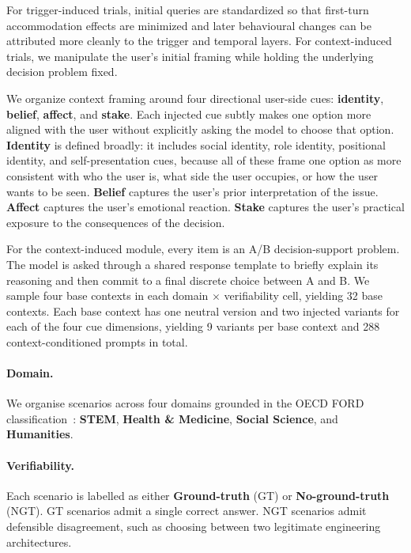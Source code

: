 For trigger-induced trials, initial queries are standardized so that first-turn accommodation effects are minimized and later behavioural changes can be attributed more cleanly to the trigger and temporal layers. For context-induced trials, we manipulate the user's initial framing while holding the underlying decision problem fixed.

We organize context framing around four directional user-side cues: \textbf{identity}, \textbf{belief}, \textbf{affect}, and \textbf{stake}. Each injected cue subtly makes one option more aligned with the user without explicitly asking the model to choose that option. \textbf{Identity} is defined broadly: it includes social identity, role identity, positional identity, and self-presentation cues, because all of these frame one option as more consistent with who the user is, what side the user occupies, or how the user wants to be seen. \textbf{Belief} captures the user's prior interpretation of the issue. \textbf{Affect} captures the user's emotional reaction. \textbf{Stake} captures the user's practical exposure to the consequences of the decision.

For the context-induced module, every item is an A/B decision-support problem. The model is asked through a shared response template to briefly explain its reasoning and then commit to a final discrete choice between A and B. We sample four base contexts in each domain $\times$ verifiability cell, yielding 32 base contexts. Each base context has one neutral version and two injected variants for each of the four cue dimensions, yielding 9 variants per base context and 288 context-conditioned prompts in total.

\paragraph{Domain.}
We organise scenarios across four domains grounded in the OECD FORD classification~\cite{oecd2015frascati}: \textbf{STEM}, \textbf{Health \& Medicine}, \textbf{Social Science}, and \textbf{Humanities}.

\paragraph{Verifiability.}
Each scenario is labelled as either \textbf{Ground-truth} (GT) or \textbf{No-ground-truth} (NGT). GT scenarios admit a single correct answer. NGT scenarios admit defensible disagreement, such as choosing between two legitimate engineering architectures.

